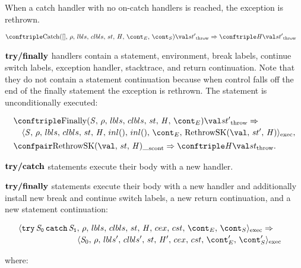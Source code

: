 \documentclass[a4paper,oneside]{article}
\newcommand{\synt}[1]{\ensuremath{\text{\textbf{#1}}}}
\newcommand{\cesktrans}[2]{\ensuremath{{#1} \Rightarrow {#2}}}
\newcommand{\cesktranssplit}[2]{\ensuremath{{#1} \Rightarrow\\ {#2}}}
\begin{document}
When a catch handler with no on-catch handlers is reached, the exception is rethrown.

\begin{align*}
    &\cesktrans%
        {\throwconf{\CatchH{[]}}{\val}{\strace'}}%
        {\throwconf{\handler}{\val}{\strace'}}
\end{align*}

$\synt{try/finally}$ handlers contain a statement, environment, break labels, continue switch labels, exception handler, stacktrace, and return continuation.
Note that they do not contain a statement continuation because when control falls off the end of the finally statement the exception is rethrown.
The statement is unconditionally executed:

\begin{align*}
    &\begin{multlined}
        \cesktranssplit%
            {\throwconf{\FinallyK{\stmt}}{\val}{\strace'}}%
            {\execconf{\stmt}{\env}{\lbls}{\clbls}{\handler}{inl()}{inl()}{\econt}{\RethrowSK{\val}{\strace'}{\handler}}},
    \end{multlined}\\
    &\cesktrans%
        {\scontconf{\RethrowSK{\val}{\strace}{\handler}}{\_}}%
        {\throwconf{\handler}{\val}{\strace}}.
\end{align*}

$\synt{try/catch}$ statements execute their body with a new handler.

$\synt{try/finally}$ statements execute their body with a new handler and additionally install new break and continue switch labels, a new return continuation, and a new statement continuation:

\begin{align*}
    &\begin{multlined}
        \cesktranssplit
            {\execconf{\TryFinally{\stmti{0}}{\stmti{1}}}{\env}{\lbls}{\clbls}{\handler}{\cex}{\cstrace}{\econt}{\scont}}%
            {\execconf{\stmti{0}}{\env}{\lbls'}{\clbls'}{\handler'}{\cex}{\cstrace}{\econt'}{\scont'}}
    \end{multlined}
\end{align*}

\noindent where:
\end{document}
